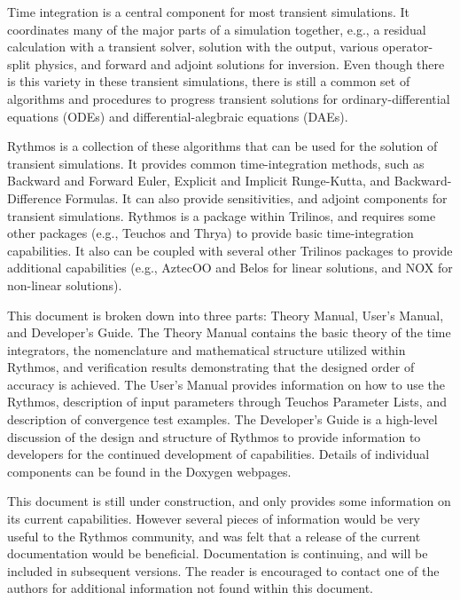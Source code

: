 Time integration is a central component for most transient simulations.
It coordinates many of the major parts of a simulation together, e.g.,
a residual calculation with a transient solver, solution with the
output, various operator-split physics, and forward and adjoint solutions
for inversion. Even though there is this variety in these transient
simulations, there is still a common set of algorithms and procedures
to progress transient solutions for ordinary-differential equations
(ODEs) and differential-alegbraic equations (DAEs). 

Rythmos is a collection of these algorithms that can be used for the
solution of transient simulations. It provides common time-integration
methods, such as Backward and Forward Euler, Explicit and Implicit
Runge-Kutta, and Backward-Difference Formulas. It can also provide
sensitivities, and adjoint components for transient simulations. Rythmos
is a package within Trilinos, and requires some other packages (e.g.,
Teuchos and Thrya) to provide basic time-integration capabilities.
It also can be coupled with several other Trilinos packages to provide
additional capabilities (e.g., AztecOO and Belos for linear solutions,
and NOX for non-linear solutions).

This document is broken down into three parts: Theory Manual, User's
Manual, and Developer's Guide. The Theory Manual contains the basic
theory of the time integrators, the nomenclature and mathematical
structure utilized within Rythmos, and verification results demonstrating
that the designed order of accuracy is achieved. The User's Manual
provides information on how to use the Rythmos, description of input
parameters through Teuchos Parameter Lists, and description of convergence
test examples. The Developer's Guide is a high-level discussion of
the design and structure of Rythmos to provide information to developers
for the continued development of capabilities. Details of individual
components can be found in the Doxygen webpages.

This document is still under construction, and only provides some
information on its current capabilities. However several pieces of
information would be very useful to the Rythmos community, and was
felt that a release of the current documentation would be beneficial.
Documentation is continuing, and will be included in subsequent versions.
The reader is encouraged to contact one of the authors for additional
information not found within this document.
